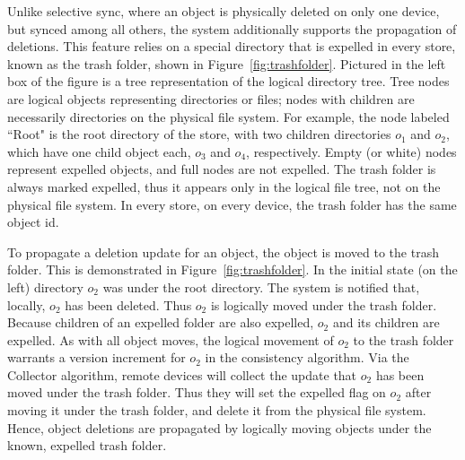 Unlike selective sync, where an object is physically deleted on only one device,
but synced among all others, the system additionally supports the propagation of
deletions. This feature relies on a special directory that is expelled in
every store, known as the {trash folder}, shown in
Figure~\ref{fig:trashfolder}. Pictured in the left box of the figure is a tree
representation of the logical directory tree. Tree nodes are logical objects
representing directories or files; nodes with children are necessarily
directories on the physical file system. For example, the node labeled ``Root"
is the root directory of the store, with two children directories $o_1$
and $o_2$, which have one child object each, $o_3$ and $o_4$, respectively.
Empty (or white) nodes represent expelled objects, and full nodes are not
expelled. The trash folder is always marked expelled, thus it appears only in
the logical file tree, not on the physical file system. In every store,
on every device, the trash folder has the same object id.

To propagate a deletion update for an object, the object is moved to the trash
folder. This is demonstrated in Figure~\ref{fig:trashfolder}. In the initial
state (on the left) directory $o_2$ was under the root directory. The system
is notified that, locally, $o_2$ has been deleted. Thus $o_2$ is logically moved
under the trash folder. Because children of an expelled folder are also
expelled, $o_2$ and its children are expelled. As with all object moves, the
logical movement of $o_2$ to the trash folder warrants a version increment for
$o_2$ in the consistency algorithm. Via the Collector algorithm, remote devices
will collect the update that $o_2$ has been moved under the trash folder. Thus
they will set the expelled flag on $o_2$ after moving it under the trash folder,
and delete it from the physical file system. Hence, object deletions are
propagated by logically moving objects under the known, expelled trash folder.

%
